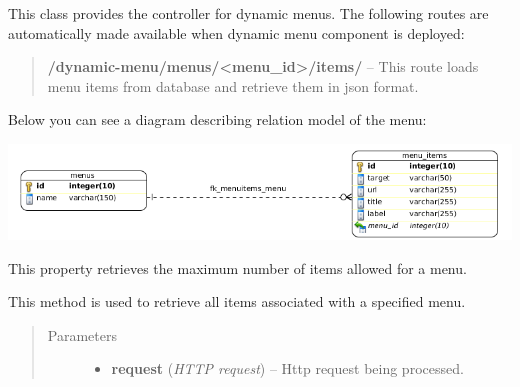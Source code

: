 \documentclass[letterpaper,10pt,english]{sphinxmanual}
\begin{document}
\begin{fulllineitems}
\label{features/components/dynamic_menu/dynamic_menu:fantastico.contrib.dynamic_menu.menu_controller.DynamicMenuController}
This class provides the controller for dynamic menus. The following routes are automatically made available
when dynamic menu component is deployed:
\begin{quote}

\textbf{/dynamic-menu/menus/\textless{}menu\_id\textgreater{}/items/} -- This route loads menu items from database and retrieve them in json format.
\end{quote}

Below you can see a diagram describing relation model of the menu:

\includegraphics{erd.png}

\begin{fulllineitems}
\label{features/components/dynamic_menu/dynamic_menu:fantastico.contrib.dynamic_menu.menu_controller.DynamicMenuController.max_items}
This property retrieves the maximum number of items allowed for a menu.

\end{fulllineitems}


\begin{fulllineitems}
\label{features/components/dynamic_menu/dynamic_menu:fantastico.contrib.dynamic_menu.menu_controller.DynamicMenuController.retrieve_menu_items}
This method is used to retrieve all items associated with a specified menu.
\begin{quote}\begin{description}
\item[{Parameters}] \leavevmode\begin{itemize}
\item {} 
\textbf{request} (\emph{HTTP request}) -- Http request being processed.


\end{itemize}
\end{description}
\end{quote}
\end{fulllineitems}
\end{fulllineitems}
\end{document}
